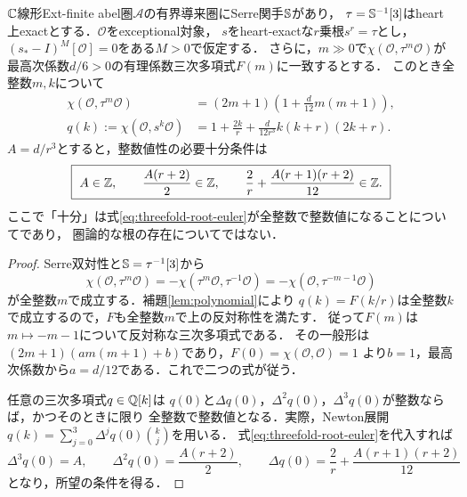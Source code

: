 \documentclass[11pt,a4paper]{ltjsarticle}
\begin{document}
\begin{theorem}[三次元の正規化根とEuler次数]\label{thm:threefold-arithmetic}
$\mathbb C$線形Ext-finite abel圏$\mathcal A$の有界導来圏にSerre関手$\mathbb S$があり，
$\tau=\mathbb S^{-1}[3]$はheart上exactとする．$\mathcal O$をexceptional対象，
$s$をheart-exactな$r$乗根$s^r=\tau$とし，
$(s_*-I)^M[\mathcal O]=0$をある$M>0$で仮定する．
さらに，$m\gg0$で$\chi(\mathcal O,\tau^m\mathcal O)$が
最高次係数$d/6>0$の有理係数三次多項式$F(m)$に一致するとする．
このとき全整数$m,k$について
\begin{align}
 \chi(\mathcal O,\tau^m\mathcal O)
   &=(2m+1)\left(1+\frac d{12}m(m+1)\right),\label{eq:threefold-anti-euler}\\
 q(k):=\chi(\mathcal O,s^k\mathcal O)
   &=1+\frac{2k}{r}+\frac d{12r^3}k(k+r)(2k+r).\label{eq:threefold-root-euler}
\end{align}
$A=d/r^3$とすると，整数値性の必要十分条件は
\begin{equation}\label{eq:threefold-congruences}
 \boxed{\ A\in\mathbb Z,\qquad \frac{A(r+2)}2\in\mathbb Z,
 \qquad \frac2r+\frac{A(r+1)(r+2)}{12}\in\mathbb Z.\ }
\end{equation}
ここで「十分」は式\eqref{eq:threefold-root-euler}が全整数で整数値になることについてであり，
圏論的な根の存在についてではない．
\end{theorem}
\begin{proof}
Serre双対性と$\mathbb S=\tau^{-1}[3]$から
\[
 \chi(\mathcal O,\tau^m\mathcal O)
 =-\chi(\tau^m\mathcal O,\tau^{-1}\mathcal O)
 =-\chi(\mathcal O,\tau^{-m-1}\mathcal O)
\]
が全整数$m$で成立する．補題\ref{lem:polynomial}により
$q(k)=F(k/r)$は全整数$k$で成立するので，$F$も全整数$m$で上の反対称性を満たす．
従って$F(m)$は$m\mapsto-m-1$について反対称な三次多項式である．
その一般形は$(2m+1)(a m(m+1)+b)$であり，$F(0)=\chi(\mathcal O,\mathcal O)=1$
より$b=1$，最高次係数から$a=d/12$である．これで二つの式が従う．

任意の三次多項式$q\in\mathbb Q[k]$は
$q(0)$と$\Delta q(0)$，$\Delta^2q(0)$，$\Delta^3q(0)$が整数ならば，かつそのときに限り
全整数で整数値となる．実際，Newton展開
$q(k)=\sum_{j=0}^3\Delta^jq(0)\binom{k}{j}$を用いる．
式\eqref{eq:threefold-root-euler}を代入すれば
\[
 \Delta^3q(0)=A,\qquad
 \Delta^2q(0)=\frac{A(r+2)}2,\qquad
 \Delta q(0)=\frac2r+\frac{A(r+1)(r+2)}{12}
\]
となり，所望の条件を得る．
\end{proof}
\end{document}
